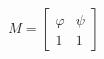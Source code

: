 \documentclass[preview]{standalone}
\begin{document}
\begin{align*}
M = \begin{bmatrix} \varphi & \psi \\ 1 & 1 \end{bmatrix}
\end{align*}
\end{document}
